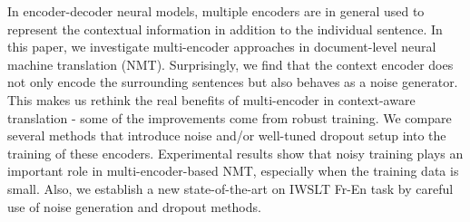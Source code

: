 In encoder-decoder neural models, multiple encoders are in general used to represent the contextual information in addition to the individual sentence. In this paper, we investigate multi-encoder approaches in document-level neural machine translation (NMT). Surprisingly, we find that the context encoder does not only encode the surrounding sentences but also behaves as a noise generator. This makes us rethink the real benefits of multi-encoder in context-aware translation - some of the improvements come from robust training. We compare several methods that introduce noise and/or well-tuned dropout setup into the training of these encoders. Experimental results show that noisy training plays an important role in multi-encoder-based NMT, especially when the training data is small. Also, we establish a new state-of-the-art on IWSLT Fr-En task by careful use of noise generation and dropout methods.
